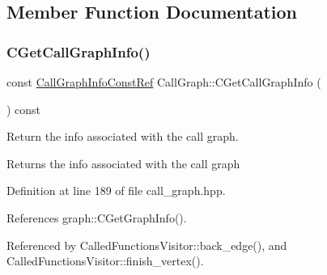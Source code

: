 \subsection{Member Function Documentation}
\mbox{\label{classCallGraph_a83bb9b87d1ff9829a11affd314b94e8f}} 
\subsubsection{\texorpdfstring{C\+Get\+Call\+Graph\+Info()}{CGetCallGraphInfo()}}
{\footnotesize\ttfamily const \hyperlink{call__graph_8hpp_a347c2311be22aecc58822b8d40776f47}{Call\+Graph\+Info\+Const\+Ref} Call\+Graph\+::\+C\+Get\+Call\+Graph\+Info (\begin{DoxyParamCaption}{ }\end{DoxyParamCaption}) const\hspace{0.3cm}{\ttfamily [inline]}}



Return the info associated with the call graph. 

\begin{DoxyReturn}{Returns}
the info associated with the call graph 
\end{DoxyReturn}


Definition at line 189 of file call\+\_\+graph.\+hpp.



References graph\+::\+C\+Get\+Graph\+Info().



Referenced by Called\+Functions\+Visitor\+::back\+\_\+edge(), and Called\+Functions\+Visitor\+::finish\+\_\+vertex().

